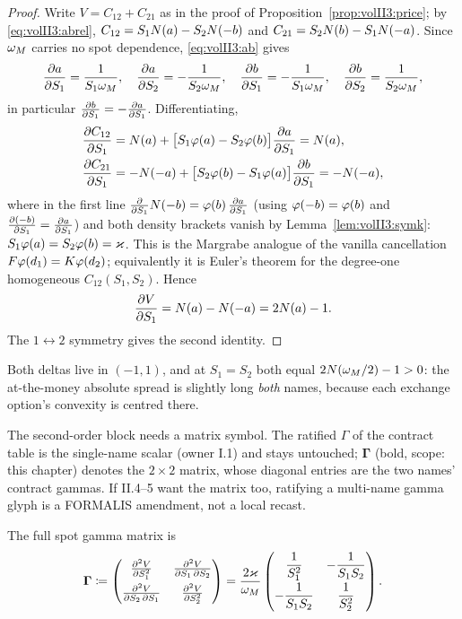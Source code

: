 \begin{proof}
Write $V = C_{12} + C_{21}$ as in the proof of
Proposition~\ref{prop:volII3:price}; by \eqref{eq:volII3:abrel},
$C_{12} = S_1N(a) - S_2N(-b)$ and
$C_{21} = S_2N(b) - S_1N(-a)$. Since $\omega_M$ carries no spot
dependence, \eqref{eq:volII3:ab} gives
\begin{equation}\label{eq:volII3:abpartials}
\frac{\partial a}{\partial S_1} = \frac{1}{S_1\omega_M}, \quad
\frac{\partial a}{\partial S_2} = -\frac{1}{S_2\omega_M}, \quad
\frac{\partial b}{\partial S_1} = -\frac{1}{S_1\omega_M}, \quad
\frac{\partial b}{\partial S_2} = \frac{1}{S_2\omega_M},
\end{equation}
in particular $\frac{\partial b}{\partial S_1} = -\frac{\partial a}{\partial S_1}$. Differentiating,
\begin{align}
\frac{\partial C_{12}}{\partial S_1}
&= N(a) + \bigl[S_1\varphi(a) - S_2\varphi(b)\bigr]\frac{\partial a}{\partial S_1}
 = N(a), \label{eq:volII3:margrabedeltas}\\
\frac{\partial C_{21}}{\partial S_1}
&= -N(-a) + \bigl[S_2\varphi(b) - S_1\varphi(a)\bigr]\frac{\partial b}{\partial S_1}
 = -N(-a), \notag
\end{align}
where in the first line $\frac{\partial }{\partial S_1}N(-b) = \varphi(b)\,\frac{\partial a}{\partial S_1}$ (using
$\varphi(-b) = \varphi(b)$ and $\frac{\partial (-b)}{\partial S_1} = \frac{\partial a}{\partial S_1}$) and both density
brackets vanish by Lemma~\ref{lem:volII3:symk}: $S_1\varphi(a) = S_2\varphi(b) =
\varkappa$. This is the Margrabe analogue of the vanilla cancellation
$F\varphi(d_1) = K\varphi(d_2)$; equivalently it is Euler's theorem for the
degree-one homogeneous $C_{12}(S_1, S_2)$. Hence
\begin{equation}\label{eq:volII3:delta1}
\frac{\partial V}{\partial S_1} = N(a) - N(-a) = 2N(a) - 1 .
\end{equation}
The $1 \leftrightarrow 2$ symmetry gives the second identity.
\end{proof}

Both deltas live in $(-1, 1)$, and at $S_1 = S_2$ both equal
$2N(\omega_M/2) - 1 > 0$: the at-the-money absolute spread is slightly long
\emph{both} names, because each exchange option's convexity is centred there.

The second-order block needs a matrix symbol. The ratified $\Gamma$ of
the contract table is the single-name scalar (owner I.1) and stays untouched;
$\mathbf{\Gamma}$ (bold, scope: this chapter) denotes the $2\times 2$
matrix, whose diagonal entries are the two names' contract gammas. If II.4--5
want the matrix too, ratifying a multi-name gamma glyph is a FORMALIS
amendment, not a local recast.

\begin{proposition}\label{prop:volII3:gamma}
The full spot gamma matrix is
\begin{equation}\label{eq:volII3:gamma}
\mathbf{\Gamma} \coloneqq
\begin{pmatrix}
\frac{\partial^2 V}{\partial S_1^2} & \frac{\partial^2 V}{\partial S_1\,\partial S_2} \\[0.6em]
\frac{\partial^2 V}{\partial S_2\,\partial S_1} & \frac{\partial^2 V}{\partial S_2^2}
\end{pmatrix}
= \frac{2\varkappa}{\omega_M}
\begin{pmatrix}
\dfrac{1}{S_1^2} & -\dfrac{1}{S_1 S_2} \\[0.8em]
-\dfrac{1}{S_1 S_2} & \dfrac{1}{S_2^2}
\end{pmatrix}.
\end{equation}
\end{proposition}

